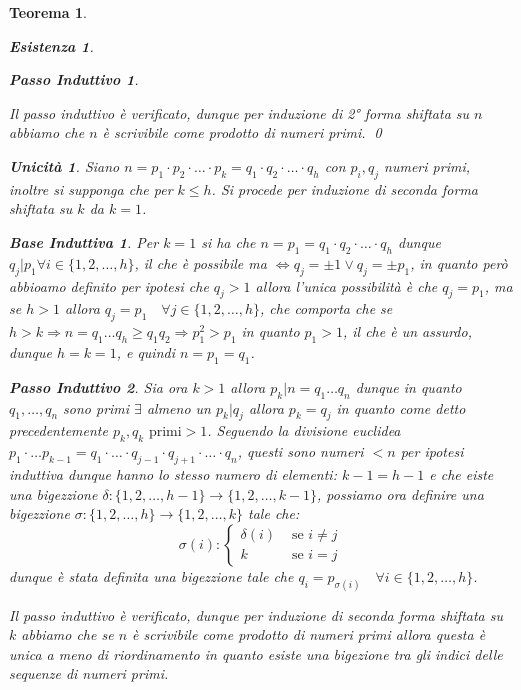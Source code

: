 \documentclass{article}
\makeatletter
\renewenvironment{proof}[1][\proofname]{\par
    \pushQED{\qed}%
    \normalfont \topsep6\p@\@plus6\p@\relax
    \trivlist
    \item\relax
    {\itshape
    #1\@addpunct{.}}\hspace\labelsep\ignorespaces
    }{%
    \popQED\endtrivlist\@endpefalse
}
\newtheorem{theorem}{Teorema}[part]
\newtheorem*{existence}{Esistenza}
\newtheorem*{uniqueness}{Unicità}
\newtheorem*{base}{Base Induttiva}
\newtheorem*{step}{Passo Induttivo}
\makeatother
\begin{document}
\begin{theorem}
\begin{proof}
\begin{existence}
\begin{step}
\begin{itemize}
                \end{itemize}
            \end{step}
            Il passo induttivo è verificato, dunque per induzione di 2° forma shiftata su \(n\) abbiamo che \(n\) è scrivibile come prodotto di numeri primi.
            \qed
        \end{existence}
        \begin{uniqueness}
            Siano \(n=p_1\cdot p_2\cdot\ldots\cdot p_k=q_1\cdot q_2\cdot\ldots\cdot q_h\) con \(p_i,q_j\) numeri primi, inoltre si supponga che per \(k\leq h\). Si procede per induzione di seconda forma shiftata su \(k\) da \(k=1\).
            \begin{base}
                Per \(k=1\) si ha che \(n=p_1=q_1\cdot q_2\cdot\ldots\cdot q_h\) dunque \(q_j|p_1\forall i\in \{1,2,\ldots,h\}\), il che è possibile ma \(\Leftrightarrow q_j=\pm 1\lor q_j=\pm p_1\), in quanto però abbioamo definito per ipotesi che \(q_j>1\) allora l'unica possibilità è che \(q_j=p_1\), ma se \(h>1\) allora \(q_j=p_1\quad \forall j\in\{1,2,\ldots,h\}\), che comporta che se \(h>k\Rightarrow n=q_1\ldots q_h\geq q_1q_2\Rightarrow p_1^2>p_1\) in quanto \(p_1>1\), il che è un assurdo, dunque \(h=k=1\), e quindi \(n=p_1=q_1\).
            \end{base}
            \begin{step}
                Sia ora \(k>1\) allora \(p_k|n=q_1\ldots q_n\) dunque in quanto \(q_1,\dots,q_n\) sono primi \(\exists\) almeno un \(p_k|q_j\) allora \(p_k=q_j\) in quanto come detto precedentemente \(p_k,q_k\text{ primi}>1\). Seguendo la divisione euclidea \(p_1\cdot\ldots p_{k-1} = q_1\cdot\ldots\cdot q_{j-1}\cdot q_{j+1}\cdot\ldots\cdot q_n\), questi sono numeri \(<n\) per ipotesi induttiva dunque hanno lo stesso numero di elementi: \(k-1=h-1\) e che eiste una bigezzione \(\delta:\{1,2,\ldots,h-1\}\rightarrow\{1,2,\ldots,k-1\}\), possiamo ora definire una bigezzione \(\sigma:\{1,2,\ldots,h\}\rightarrow\{1,2,\ldots,k\}\) tale che:\[
                    \sigma(i):\begin{cases}
                        \delta(i)&\text{ se } i\neq j\\
                        k&\text{ se } i=j
                    \end{cases}
                \] 
                dunque è stata definita una bigezzione tale che \(q_i=p_{\sigma(i)}\quad \forall i\in\{1,2,\ldots,h\}\).
            \end{step}
            Il passo induttivo è verificato, dunque per induzione di seconda forma shiftata su \(k\) abbiamo che se \(n\) è scrivibile come prodotto di numeri primi allora questa è unica a meno di riordinamento in quanto esiste una bigezione tra gli indici delle sequenze di numeri primi.
        \end{uniqueness}
        \raggedleft{\pushQED{\ensuremath{\blacksquare}}}
    \end{proof}
\end{theorem}
\end{document}
